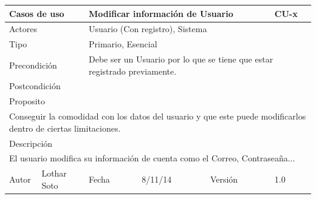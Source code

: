 \documentclass{article}
\begin{document}
\begin{table}[h]
\begin{tabular}{|l|l|l|l|l|l|}
\hline
\multicolumn{2}{|p{2cm}|}{Casos de uso}  & \multicolumn{3}{p{7cm}|}{\textbf{Modificar información de Usuario}} & CU-x \\
\hline
\multicolumn{2}{|p{2cm}|}{Actores}       & \multicolumn{4}{p{8cm}|}{Usuario (Con registro), Sistema}        \\
\hline
\multicolumn{2}{|p{2cm}|}{Tipo}          & \multicolumn{4}{p{8cm}|}{Primario, Esencial}        \\
\hline
\multicolumn{2}{|p{2cm}|}{Precondición}  & \multicolumn{4}{p{8cm}|}{Debe ser un Usuario por lo que se tiene que estar registrado previamente.}        \\
\hline
\multicolumn{2}{|p{2cm}|}{Postcondición} & \multicolumn{4}{p{8cm}|}{}        \\
\hline
\multicolumn{6}{|p{10cm}|}{Proposito}                                   \\
\hline
\multicolumn{6}{|p{10cm}|}{Conseguir la comodidad con los datos del usuario y que este puede modificarlos dentro de ciertas limitaciones.}                                            \\
\hline
\multicolumn{6}{|p{10cm}|}{Descripción}                                 \\
\hline
\multicolumn{6}{|p{10cm}|}{El usuario modifica su información de cuenta como el Correo, Contraseaña...}                                            \\
\hline
Autor              &     Lothar Soto         & Fecha    &  8/11/14   &   Versión  & 1.0\\     
\hline
\end{tabular}
\end{table}
\end{document}
